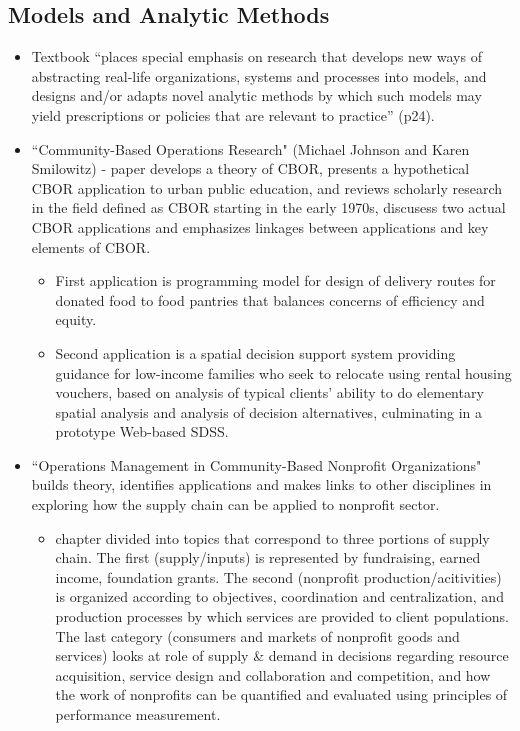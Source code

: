 \documentclass{article}
\begin{document}
\subsection{Models and Analytic Methods}
\begin{itemize}
\item Textbook ``places special emphasis on research that develops new ways of abstracting real-life organizations, systems and processes into models, and designs and/or adapts novel analytic methods by which such models may yield prescriptions or policies that are relevant to practice'' (p24).
\item ``Community-Based Operations Research" (Michael Johnson and Karen Smilowitz) - paper develops a theory of CBOR, presents a hypothetical CBOR application to urban public education, and reviews scholarly research in the field defined as CBOR starting in the early 1970s, discusess two actual CBOR applications and emphasizes linkages between applications and key elements of CBOR.
	\begin{itemize}
	\item First application is programming model for design of delivery routes for donated food to food pantries that balances concerns of efficiency and equity. 
	\item Second application is a spatial decision support system providing guidance for low-income families who seek to relocate using rental housing vouchers, based on analysis of typical clients' ability to do elementary spatial analysis and analysis of decision alternatives, culminating in a prototype Web-based SDSS.
	\end{itemize}
\item ``Operations Management in Community-Based Nonprofit Organizations" builds theory, identifies applications and makes links to other disciplines in exploring how the supply chain can be applied to nonprofit sector.
	\begin{itemize}
	\item chapter divided into topics that correspond to three portions of supply chain. The first (supply/inputs) is represented by fundraising, earned income, foundation grants. The second (nonprofit production/acitivities) is organized according to objectives, coordination and centralization, and production processes by which services are provided to client populations. The last category (consumers and markets of nonprofit goods and services) looks at role of supply \& demand in decisions regarding resource acquisition, service design and collaboration and competition, and how the work of nonprofits can be quantified and evaluated using principles of performance measurement.

\end{itemize}
\end{itemize}
\end{document}
